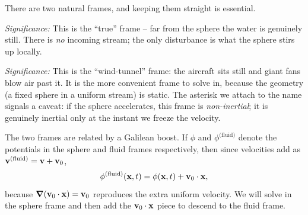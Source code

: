 \documentclass[../main.tex]{subfiles}
\begin{document}
There are two natural frames, and keeping them straight is essential.

\textit{Significance:} This is the ``true'' frame -- far from the sphere the water is genuinely still. There is \emph{no} incoming stream; the only disturbance is what the sphere stirs up locally.

\textit{Significance:} This is the ``wind-tunnel'' frame: the aircraft sits still and giant fans blow air past it. It is the more convenient frame to solve in, because the geometry (a fixed sphere in a uniform stream) is static. The asterisk we attach to the name signals a caveat: if the sphere accelerates, this frame is \emph{non-inertial}; it is genuinely inertial only at the instant we freeze the velocity.

The two frames are related by a Galilean boost. If $\phi$ and $\phi^{\text{(fluid)}}$ denote the potentials in the sphere and fluid frames respectively, then since velocities add as $\mathbf{v}^{\text{(fluid)}}=\mathbf{v}+\mathbf{v}_0$,
\begin{equation}
  \phi^{\text{(fluid)}}(\mathbf{x},t) = \phi(\mathbf{x},t) + \mathbf{v}_0\cdot\mathbf{x},
  \label{eq:lec16_galilean}
\end{equation}
because $\grad(\mathbf{v}_0\cdot\mathbf{x})=\mathbf{v}_0$ reproduces the extra uniform velocity. We will solve in the sphere frame and then add the $\mathbf{v}_0\cdot\mathbf{x}$ piece to descend to the fluid frame.
\end{document}
